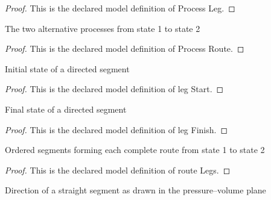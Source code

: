 \begin{proof}
  This is the declared model definition of Process Leg.
\end{proof}
\begin{definition}
  \label{def:physics:phyx-mini-0368:phyxminiproblems-problemphyxmini0368-processroute}
  The two alternative processes from state 1 to state 2
\end{definition}
\begin{proof}
  This is the declared model definition of Process Route.
\end{proof}
\begin{definition}
  \label{def:physics:phyx-mini-0368:phyxminiproblems-problemphyxmini0368-legstart}
  Initial state of a directed segment
\end{definition}
\begin{proof}
  This is the declared model definition of leg Start.
\end{proof}
\begin{definition}
  \label{def:physics:phyx-mini-0368:phyxminiproblems-problemphyxmini0368-legfinish}
  Final state of a directed segment
\end{definition}
\begin{proof}
  This is the declared model definition of leg Finish.
\end{proof}
\begin{definition}
  \label{def:physics:phyx-mini-0368:phyxminiproblems-problemphyxmini0368-routelegs}
  Ordered segments forming each complete route from state 1 to state 2
\end{definition}
\begin{proof}
  This is the declared model definition of route Legs.
\end{proof}
\begin{definition}
  \label{def:physics:phyx-mini-0368:phyxminiproblems-problemphyxmini0368-segmentdirection}
  Direction of a straight segment as drawn in the pressure--volume plane
\end{definition}

